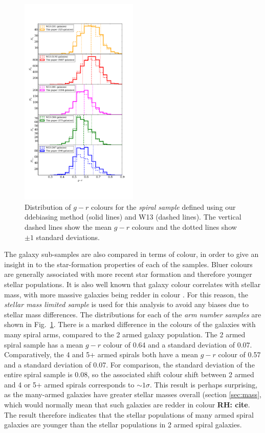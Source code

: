 \documentclass[useAMS,usenatbib]{mn2e}
\newcommand{\rh}[1]{{\bf \textcolor{RoyalPurple}{RH: #1}}}
\begin{document}
\begin{figure}
		\centering

        \includegraphics[width=0.5\textwidth]{Histograms/colour_histogram.pdf}

        \caption{Distribution of $g-r$ colours for the \textit{spiral sample} defined using our ddebiasing method (solid lines) and W13 (dashed lines). The vertical dashed lines show the mean $g-r$ colours and the dotted lines show $\pm1$ standard deviations.}

        \label{fig:colour_histogram}

\end{figure}

The galaxy sub-samples are also compared in terms of colour, in order to give an insight in to the star-formation properties of each of the samples. Bluer colours are generally associated with more recent star formation and therefore younger stellar populations. It is also well known that galaxy colour correlates with stellar mass, with more massive galaxies being redder in colour \citep{Baldry_06}. For this reason, the \textit{stellar mass limited sample} is used for this analysis to avoid any biases due to stellar mass differences. The distributions for each of the \textit{arm number samples} are shown in Fig.~\ref{fig:colour_histogram}. There is a marked difference in the colours of the galaxies with many spiral arms, compared to the 2 armed galaxy population. The 2 armed spiral sample has a mean $g-r$ colour of 0.64 and a standard deviation of 0.07. Comparatively, the 4 and 5+ armed spirals both have a mean $g-r$ colour of 0.57 and a standard deviation of 0.07. For comparison, the standard deviation of the entire spiral sample is 0.08, so the associated shift colour shift between 2 armed and 4 or 5+ armed spirals corresponds to $\sim 1 \sigma$. This result is perhaps surprising, as the many-armed galaxies have greater stellar masses overall (section \ref{sec:mass}, which would normally mean that such galaxies are redder in colour \rh{cite}. The result therefore indicates that the stellar populations of many armed spiral galaxies are younger than the stellar populations in 2 armed spiral galaxies.
\end{document}
